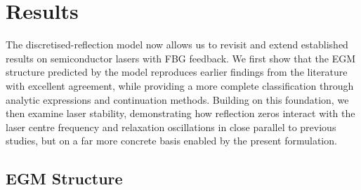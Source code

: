 \section{Results}
\label{sec:model_comparison}
%
The discretised-reflection model now allows us to revisit and extend established results on semiconductor lasers with FBG feedback. 
We first show that the EGM structure predicted by the model reproduces earlier findings from the literature with excellent agreement, while providing a more complete classification through analytic expressions and continuation methods. 
Building on this foundation, we then examine laser stability, demonstrating how reflection zeros interact with the laser centre frequency and relaxation oscillations in close parallel to previous studies, but on a far more concrete basis enabled by the present formulation.
%
%
\subsection{EGM Structure}
\label{subsec:EGM_structure}
%
